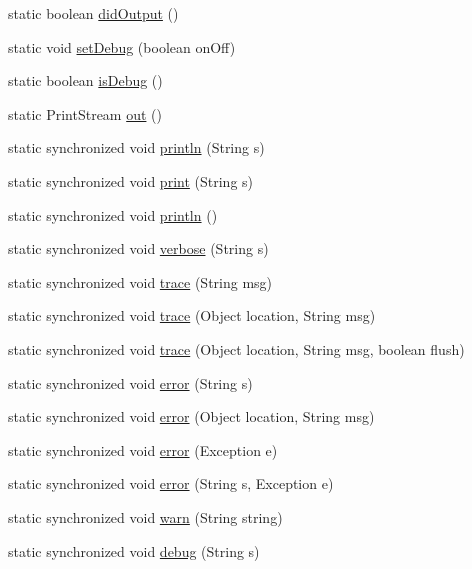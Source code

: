 \begin{DoxyCompactItemize}
static boolean \hyperlink{classorg_1_1tzi_1_1use_1_1util_1_1_log_af9001be61e0fc13f856a3d471883cd52}{did\-Output} ()
\item 
static void \hyperlink{classorg_1_1tzi_1_1use_1_1util_1_1_log_acb4b593d01f378f02d490d18e7206e2c}{set\-Debug} (boolean on\-Off)
\item 
static boolean \hyperlink{classorg_1_1tzi_1_1use_1_1util_1_1_log_a9a9412a6a57bb6871e685fd5b0ed5272}{is\-Debug} ()
\item 
static Print\-Stream \hyperlink{classorg_1_1tzi_1_1use_1_1util_1_1_log_aacc1204fa930d97f4837f853895b4f0a}{out} ()
\item 
static synchronized void \hyperlink{classorg_1_1tzi_1_1use_1_1util_1_1_log_ad42fb88aee571ed084642776b8d763b9}{println} (String s)
\item 
static synchronized void \hyperlink{classorg_1_1tzi_1_1use_1_1util_1_1_log_a6e82d8e36625ff429155c478d3d3f9a4}{print} (String s)
\item 
static synchronized void \hyperlink{classorg_1_1tzi_1_1use_1_1util_1_1_log_a81470aa23bda5ec551680d02d706c602}{println} ()
\item 
static synchronized void \hyperlink{classorg_1_1tzi_1_1use_1_1util_1_1_log_ae51199a80cd0b70b3ee10a257a662dfc}{verbose} (String s)
\item 
static synchronized void \hyperlink{classorg_1_1tzi_1_1use_1_1util_1_1_log_a4e70459cb860490d874d58357ff904dd}{trace} (String msg)
\item 
static synchronized void \hyperlink{classorg_1_1tzi_1_1use_1_1util_1_1_log_acf0102402b552f8688ef5664cbbf37fc}{trace} (Object location, String msg)
\item 
static synchronized void \hyperlink{classorg_1_1tzi_1_1use_1_1util_1_1_log_a15f5e4207e2faa66144dee463dbd127c}{trace} (Object location, String msg, boolean flush)
\item 
static synchronized void \hyperlink{classorg_1_1tzi_1_1use_1_1util_1_1_log_a2956f47b7237e570debe0b19dea19879}{error} (String s)
\item 
static synchronized void \hyperlink{classorg_1_1tzi_1_1use_1_1util_1_1_log_afb892f84f86ab1a8ab2a5f1f42369be3}{error} (Object location, String msg)
\item 
static synchronized void \hyperlink{classorg_1_1tzi_1_1use_1_1util_1_1_log_a6b17191b6030c8e3693798057202716a}{error} (Exception e)
\item 
static synchronized void \hyperlink{classorg_1_1tzi_1_1use_1_1util_1_1_log_a6c098891d36683bd1de43aa54abf6e50}{error} (String s, Exception e)
\item 
static synchronized void \hyperlink{classorg_1_1tzi_1_1use_1_1util_1_1_log_a7ea2e26fef10571a3dd96707956573d2}{warn} (String string)
\item 
static synchronized void \hyperlink{classorg_1_1tzi_1_1use_1_1util_1_1_log_ac53a9c7534ff94cae7c321c27b3094c9}{debug} (String s)
\end{DoxyCompactItemize}



